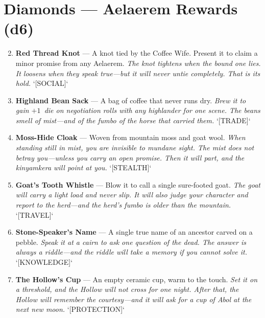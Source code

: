 \section*{Diamonds --- Aelaerem Rewards (d6)}
\label{subsec:aelaerem-rewards}
\begin{enumerate}
\setcounter{enumi}{1}
\item \textbf{Red Thread Knot} --- A knot tied by the Coffee Wife. Present it to claim a minor promise from any Aelaerem.
  \hfill \textit{The knot tightens when the bound one lies. It loosens when they speak true---but it will never untie completely. That is its hold.} `[SOCIAL]`
\item \textbf{Highland Bean Sack} --- A bag of coffee that never runs dry.
  \hfill \textit{Brew it to gain $+1$~die on negotiation rolls with any highlander for one scene. The beans smell of mist---and of the \textit{fumbo} of the horse that carried them.} `[TRADE]`
\item \textbf{Moss-Hide Cloak} --- Woven from mountain moss and goat wool.
  \hfill \textit{When standing still in mist, you are invisible to mundane sight. The mist does not betray you---unless you carry an open promise. Then it will part, and the \textit{kinyamkera} will point at you.} `[STEALTH]`
\item \textbf{Goat's Tooth Whistle} --- Blow it to call a single sure-footed goat.
  \hfill \textit{The goat will carry a light load and never slip. It will also judge your character and report to the herd---and the herd's \textit{fumbo} is older than the mountain.} `[TRAVEL]`
\item \textbf{Stone-Speaker's Name} --- A single true name of an ancestor carved on a pebble.
  \hfill \textit{Speak it at a cairn to ask one question of the dead. The answer is always a riddle---and the riddle will take a memory if you cannot solve it.} `[KNOWLEDGE]`
\item \textbf{The Hollow's Cup} --- An empty ceramic cup, warm to the touch.
  \hfill \textit{Set it on a threshold, and the Hollow will not cross for one night. After that, the Hollow will remember the courtesy---and it will ask for a cup of \textit{Abol} at the next new moon.} `[PROTECTION]`
\end{enumerate}

